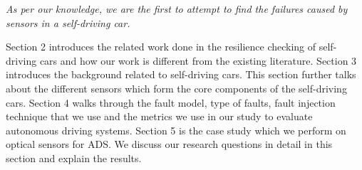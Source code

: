 \emph{As per our knowledge, we are the first to attempt to find the failures caused by sensors in a self-driving car.}

Section 2 introduces the related work done in the resilience checking of self-driving cars and how our work is different from the existing literature. Section 3 introduces the background related to self-driving cars. This section further talks about the different sensors which form the core components of the self-driving cars. Section 4 walks through the fault model, type of faults, fault injection technique that we use  and the metrics we use in our study to evaluate autonomous driving systems. Section 5 is the case study which we perform on optical sensors for ADS. We discuss our research questions in detail in this section and explain the results.
